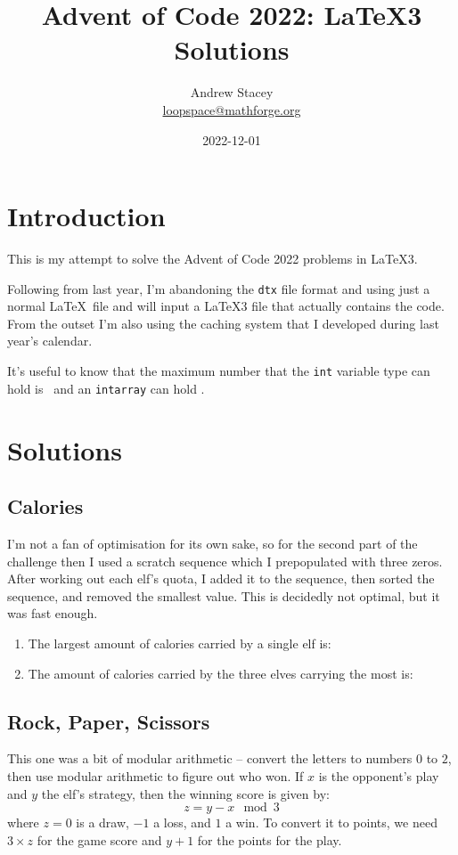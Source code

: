 \documentclass{article}
\title{Advent of Code 2022: \LaTeX3 Solutions}
\author{Andrew Stacey \\ \url{loopspace@mathforge.org}}
\date{2022-12-01}
\begin{document}
\maketitle

\section{Introduction}

This is my attempt to solve the Advent of Code 2022 problems in \LaTeX3.

Following from last year, I'm abandoning the \Verb!dtx! file format and using just a normal \LaTeX\ file and will input a \LaTeX3 file that actually contains the code.
From the outset I'm also using the caching system that I developed during last year's calendar.

It's useful to know that the maximum number that the \Verb!int! variable type can hold is \MaxInt\ and an \Verb!intarray! can hold \MaxIntarray.


\section{Solutions}

\subsection{Calories}

I'm not a fan of optimisation for its own sake, so for the second part of the challenge then I used a scratch sequence which I prepopulated with three zeros.
After working out each elf's quota, I added it to the sequence, then sorted the sequence, and removed the smallest value.
This is decidedly not optimal, but it was fast enough.

\begin{enumerate}
\item The largest amount of calories carried by a single elf is: 
\item The amount of calories carried by the three elves carrying the most is: 
\end{enumerate}

\subsection{Rock, Paper, Scissors}

This one was a bit of modular arithmetic -- convert the letters to numbers \(0\) to \(2\), then use modular arithmetic to figure out who won.
If \(x\) is the opponent's play and \(y\) the elf's strategy, then the winning score is given by:
%
\[
  z = y - x \mod 3
  \]
%
where \(z = 0\) is a draw, \(-1\) a loss, and \(1\) a win.
To convert it to points, we need \(3 \times z\) for the game score and \(y + 1\) for the points for the play.
\end{document}
